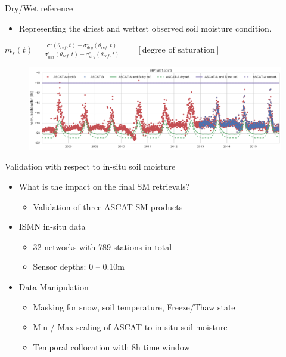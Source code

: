 \documentclass[10pt,ignorenonframetext,xcolor={dvipsnames, table}]{beamer}
\providecommand{\tightlist}{%
\setlength{\itemsep}{0pt}\setlength{\parskip}{0pt}}
\begin{document}
\begin{frame}{Dry/Wet reference}

\begin{itemize}
\tightlist
\item
  Representing the driest and wettest observed soil moisture condition.
\end{itemize}

\begin{center}
$m_{s}\left(t\right) = \frac{\sigma^{\circ}\left(\theta_{ref},t\right) -
\sigma^{\circ}_{dry}\left(\theta_{ref},t\right)}{\sigma^{\circ}_{wet}\left(\theta_{ref},t\right) -
\sigma^{\circ}_{dry}\left(\theta_{ref},t\right)} \qquad
[\text{degree of saturation}]$
\end{center}

\begin{figure}
\includegraphics[width=.8\textwidth]{./figures/norm_sigma_dry_wet_GPI815573.png}
\end{figure}

\end{frame}

\begin{frame}{Validation with respect to in-situ soil moisture}

\begin{itemize}
\tightlist
\item
  What is the impact on the final SM retrievals?

  \begin{itemize}
  \tightlist
  \item
    Validation of three ASCAT SM products
  \end{itemize}
\item
  ISMN in-situ data

  \begin{itemize}
  \tightlist
  \item
    32 networks with 789 stations in total
  \item
    Sensor depths: 0 -- 0.10m
  \end{itemize}
\item
  Data Manipulation

  \begin{itemize}
  \tightlist
  \item
    Masking for snow, soil temperature, Freeze/Thaw state
  \item
    Min / Max scaling of ASCAT to in-situ soil moisture
  \item
    Temporal collocation with 8h time window
  \end{itemize}
\end{itemize}

\end{frame}
\end{document}
